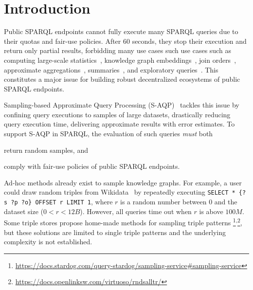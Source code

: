 
\section{Introduction}

Public SPARQL endpoints cannot fully execute many SPARQL queries due
to their quotas and fair-use policies. After 60 seconds, they stop
their execution and return only partial results, forbidding many use
cases such use cases such as computing large-scale
statistics~\cite{soulet2019anytime,10.1007/978-3-319-18818-8_14},
knowledge graph embeddings~\cite{ristoski2016rdf2vec}, join
orders~\cite{DBLP:conf/cidr/LeisRGK017}, approximate
aggregations~\cite{wang2022approximate},
summaries~\cite{10.1007/978-3-030-49461-2_10}, and exploratory
queries~\cite{DBLP:conf/sigmod/AgarwalMKTJMMS14}.  This constitutes a
major issue for building robust decentralized ecosystems of public
SPARQL endpoints.

Sampling-based Approximate Query Processing
(S-AQP)~\cite{DBLP:conf/sigmod/AgarwalMKTJMMS14} tackles this issue by
confining query executions to samples of large datasets, drastically
reducing query execution time, delivering approximate results with
error estimates.
%
To support S-AQP in SPARQL, the evaluation of such queries \emph{must}
both
\begin{inparaenum}[(i)]
\item return random samples, and
\item comply with fair-use policies of public SPARQL endpoints.
\end{inparaenum}
Ad-hoc methods already exist to sample knowledge graphs.  For example,
a user could draw random triples from
Wikidata~\cite{soulet2019anytime} by repeatedly executing
\verb|SELECT * {?s ?p ?o} OFFSET r LIMIT 1|, where $r$ is a random
number between $0$ and the dataset size ($0<r<12B$). However, all
queries time out when $r$ is above $100M$.
Some triple stores propose home-made methods for sampling triple
patterns%
\footnote{\url{https://docs.stardog.com/query-stardog/sampling-service\#sampling-service}}\textsuperscript{,}\footnote{\url{https://docs.openlinksw.com/virtuoso/rndsalltr/}},
but these solutions are limited to single triple patterns and the
underlying complexity is not established.

